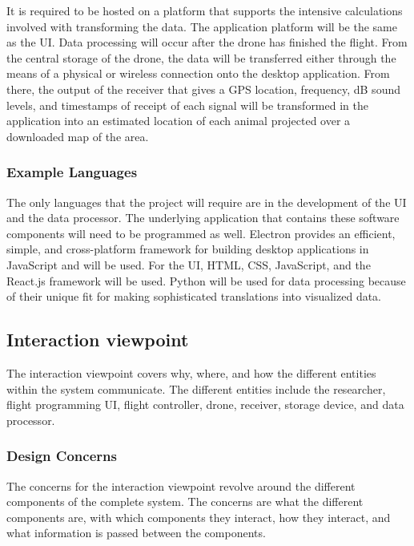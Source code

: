 \documentclass[onecolumn, draftclsnofoot,10pt, compsoc]{IEEEtran}
\begin{document}
It is required to be hosted on a platform that supports the intensive calculations involved with transforming the data.
The application platform will be the same as the UI.
Data processing will occur after the drone has finished the flight.
From the central storage of the drone, the data will be transferred either through the means of a physical or wireless connection onto the desktop application.
From there, the output of the receiver that gives a GPS location, frequency, dB sound levels, and timestamps of receipt of each signal will be transformed in the application into an estimated location of each animal projected over a downloaded map of the area.
\newline
\newline
\subsubsection{Example Languages}

The only languages that the project will require are in the development of the UI and the data processor.
The underlying application that contains these software components will need to be programmed as well.
Electron provides an efficient, simple, and cross-platform framework for building desktop applications in JavaScript and will be used.
For the UI, HTML, CSS, JavaScript, and the React.js framework will be used.
Python will be used for data processing because of their unique fit for making sophisticated translations into visualized data. 

\subsection{Interaction viewpoint}
The interaction viewpoint covers why, where, and how the different entities within the system communicate.
The different entities include the researcher, flight programming UI, flight controller, drone, receiver, storage device, and data processor.

\subsubsection{Design Concerns}
The concerns for the interaction viewpoint revolve around the different components of the complete system.
The concerns are what the different components are, with which components they interact, how they interact, and what information is passed between the components. 
\end{document}
